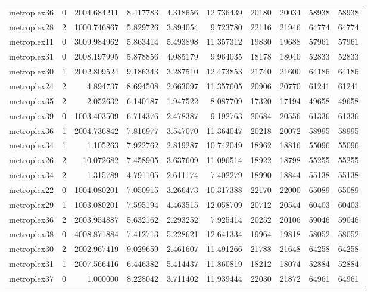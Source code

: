 \begin{longtable}{|l|r|r|r|r|r|r|r|r|r|}
metroplex36 & 0 & 2004.684211 & 8.417783 & 4.318656 & 12.736439 & 20180 & 20034 & 58938 & 58938 \\
metroplex28 & 2 & 1000.746867 & 5.829726 & 3.894054 & 9.723780 & 22116 & 21946 & 64774 & 64774 \\
metroplex11 & 0 & 3009.984962 & 5.863414 & 5.493898 & 11.357312 & 19830 & 19688 & 57961 & 57961 \\
metroplex31 & 0 & 2008.197995 & 5.878856 & 4.085179 & 9.964035 & 18178 & 18040 & 52833 & 52833 \\
metroplex30 & 1 & 2002.809524 & 9.186343 & 3.287510 & 12.473853 & 21740 & 21600 & 64186 & 64186 \\
metroplex24 & 2 & 4.894737 & 8.694508 & 2.663097 & 11.357605 & 20906 & 20770 & 61241 & 61241 \\
metroplex35 & 2 & 2.052632 & 6.140187 & 1.947522 & 8.087709 & 17320 & 17194 & 49658 & 49658 \\
metroplex39 & 0 & 1003.403509 & 6.714376 & 2.478387 & 9.192763 & 20684 & 20556 & 61336 & 61336 \\
metroplex36 & 1 & 2004.736842 & 7.816977 & 3.547070 & 11.364047 & 20218 & 20072 & 58995 & 58995 \\
metroplex34 & 1 & 1.105263 & 7.922762 & 2.819287 & 10.742049 & 18962 & 18816 & 55096 & 55096 \\
metroplex26 & 2 & 10.072682 & 7.458905 & 3.637609 & 11.096514 & 18922 & 18798 & 55255 & 55255 \\
metroplex34 & 2 & 1.315789 & 4.791105 & 2.611174 & 7.402279 & 18990 & 18844 & 55138 & 55138 \\
metroplex22 & 0 & 1004.080201 & 7.050915 & 3.266473 & 10.317388 & 22170 & 22000 & 65089 & 65089 \\
metroplex29 & 1 & 1003.080201 & 7.595194 & 4.463515 & 12.058709 & 20712 & 20544 & 60403 & 60403 \\
metroplex36 & 2 & 2003.954887 & 5.632162 & 2.293252 & 7.925414 & 20252 & 20106 & 59046 & 59046 \\
metroplex38 & 0 & 4008.871884 & 7.412713 & 5.228621 & 12.641334 & 19964 & 19818 & 58052 & 58052 \\
metroplex30 & 2 & 2002.967419 & 9.029659 & 2.461607 & 11.491266 & 21788 & 21648 & 64258 & 64258 \\
metroplex31 & 1 & 2007.566416 & 6.446382 & 5.414437 & 11.860819 & 18212 & 18074 & 52884 & 52884 \\
metroplex37 & 0 & 1.000000 & 8.228042 & 3.711402 & 11.939444 & 22030 & 21872 & 64961 & 64961 \\

\end{longtable}
